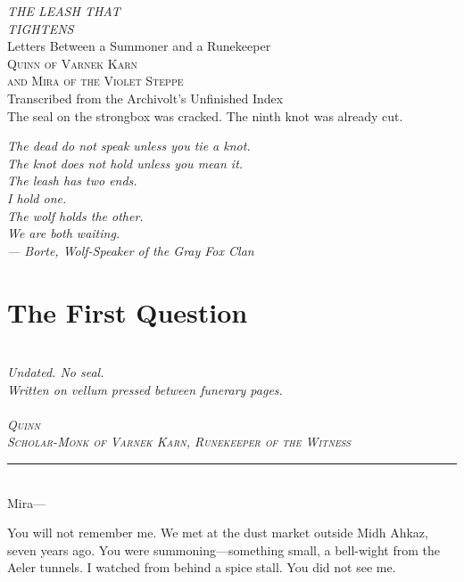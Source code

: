 \documentclass[11pt,twoside]{book}
\newcommand{\letter}[4]{%
  \begin{center}
    \itshape
    \textcolor{sealcolor}{\faEnvelope}\\[0.2cm]
    \small #1\\[0.1cm]
    \small #2\\[0.1cm]
    \textcolor{sealcolor}{\faStamp}\\[0.3cm]
    \scshape #3\\[0.1cm]
    \itshape #4\\[0.5cm]
  \end{center}
  \noindent\rule{\textwidth}{0.3pt}\\[0.3cm]
}
\begin{document}



\frontmatter

\thispagestyle{empty}
\vspace*{2cm}
\begin{center}
  {\Huge\itshape THE LEASH THAT\\[0.3cm] TIGHTENS}\\[0.5cm]
  {\large Letters Between a Summoner and a Runekeeper}\\[0.8cm]
  {\scshape Quinn of Varnek Karn\\ and Mira of the Violet Steppe}\\[0.5cm]
  \vfill
  {\small Transcribed from the Archivolt's Unfinished Index}\\[0.2cm]
  {\small The seal on the strongbox was cracked. The ninth knot was already cut.}
\end{center}
\newpage

\thispagestyle{empty}
\vspace*{3cm}
\begin{flushright}
  \itshape
  The dead do not speak unless you tie a knot.\\[0.2cm]
  The knot does not hold unless you mean it.\\[0.2cm]
  The leash has two ends.\\[0.2cm]
  I hold one.\\[0.2cm]
  The wolf holds the other.\\[0.2cm]
  We are both waiting.\\[0.2cm]
  \vspace{0.5cm}
  --- Borte, Wolf-Speaker of the Gray Fox Clan
\end{flushright}
\newpage

\tableofcontents
\newpage

\mainmatter


\chapter{The First Question}
\letter
  {Undated. No seal.}
  {Written on vellum pressed between funerary pages.}
  {Quinn}{Scholar-Monk of Varnek Karn, Runekeeper of the Witness}

Mira---

You will not remember me. We met at the dust market outside Midh Ahkaz, seven years ago. You were summoning---something small, a bell-wight from the Aeler tunnels. I watched from behind a spice stall. You did not see me.
\end{document}
